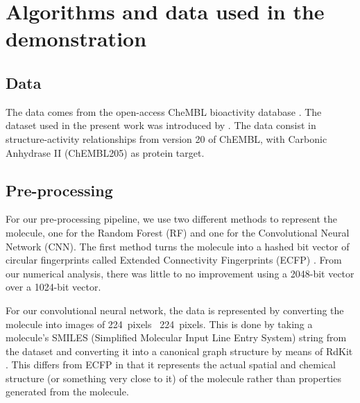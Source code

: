 \documentclass[\ifafour a4paper,12pt,\else a5paper,10pt,\fi%
onecolumn,oneside,article,%
british%
]{memoir}
\theoremstyle{remark}
\theoremstyle{innote}
\renewcommand*{\|}[1][]{\nonscript\:#1\vert\nonscript\:\mathopen{}}
\begin{document}


\clearpage
\bigskip
\renewcommand*{\appendixpagename}{Appendices: mathematical and technical details}
\appendix



\section{Algorithms and data used in the demonstration}
 
\subsection{Data} 
  
The data comes from the open-access CheMBL bioactivity database \autocites{bentoetal2014}. The dataset used in the present work was introduced by \textcite{koutsoukasetal2017}. The data consist in structure-activity relationships from version 20 of ChEMBL, with Carbonic Anhydrase II (ChEMBL205) as protein target.


\subsection{Pre-processing} 

For our pre-processing pipeline, we use two different methods to represent the molecule, one for the Random Forest (RF) and one for the Convolutional Neural Network (CNN). The first method turns the molecule into a hashed bit vector of circular fingerprints called Extended Connectivity Fingerprints (ECFP) \autocites{rogersetal2010}. From our numerical analysis, there was little to no improvement using a 2048-bit vector over a 1024-bit vector. 
  
For our convolutional neural network, the data is represented by converting the molecule into images of 224~pixels \texttimes\ 224~pixels. This is done by taking a molecule's SMILES (Simplified Molecular Input Line Entry System) string \autocites{davidetal2020} from the dataset and converting it into a canonical graph structure by means of RdKit \autocites{rdkit2017}. This differs from ECFP in that it represents the actual spatial and chemical structure (or something very close to it) of the molecule rather than properties generated from the molecule.
\end{document}
